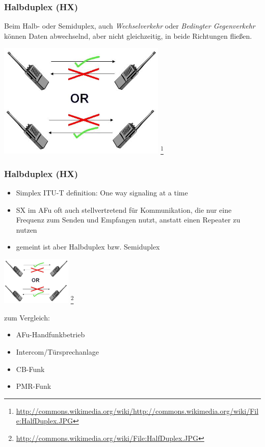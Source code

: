 \begin{frame}
    \frametitle{Halbduplex (HX)}

    Beim Halb- oder Semiduplex, auch \emph{Wechselverkehr} oder \emph{Bedingter
    Gegenverkehr} können Daten abwechselnd, aber nicht gleichzeitig, in beide
    Richtungen fließen.

    \begin{center}
        \includegraphics[width=0.6\textwidth]{bv11/HalfDuplex.jpg}
        \footnote{\tiny \url{http://commons.wikimedia.org/wiki/http://commons.wikimedia.org/wiki/File:HalfDuplex.JPG}}
    \end{center}

\end{frame}

\begin{frame}
    \frametitle{Halbduplex (HX)}

    \begin{itemize}
        \item Simplex ITU-T definition: One way signaling at a time
        \item SX im AFu oft auch stellvertretend für Kommunikation, die nur eine Frequenz
              zum Senden und Empfangen nutzt, anstatt einen Repeater zu nutzen
        \item gemeint ist aber Halbduplex bzw. Semiduplex
    \end{itemize}

    \begin{center}
        \includegraphics[width=0.25\textwidth]{bv11/HalfDuplex.jpg}
        \footnote{\tiny \url{http://commons.wikimedia.org/wiki/File:HalfDuplex.JPG}}
    \end{center}

    zum Vergleich:

    \begin{itemize}
        \item AFu-Handfunkbetrieb
        \item Intercom/Türsprechanlage
        \item CB-Funk
        \item PMR-Funk
    \end{itemize}

\end{frame}

